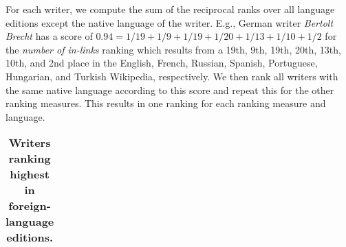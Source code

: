 \documentclass[a4paper,12pt]{scrartcl}
\begin{document}
For each writer, we compute the sum of the reciprocal ranks over all
language editions except the native language of the writer. E.g.,
German writer \emph{Bertolt Brecht} has a score of $0.94 = 1/19 + 1/9
+ 1/19 + 1/20 + 1/13 + 1/10 + 1/2$ for the \emph{number of in-links}
ranking which results from a 19th, 9th, 19th, 20th, 13th, 10th, and
2nd place in the English, French, Russian, Spanish, Portuguese,
Hungarian, and Turkish Wikipedia, respectively.
%
We then rank all writers with the same native language according to
this score and repeat this for the other ranking measures.  This
results in one ranking for each ranking measure and language.
%
%
\begin{table}
    \caption{\bf Writers ranking highest in foreign-language editions.}
  \label{tab:top5-native}
  {\footnotesize 
  \setlength{\tabcolsep}{2pt}
  \begin{tabular}{@{}llll@{}}
    \toprule



\end{tabular}}
\end{table}
\end{document}

